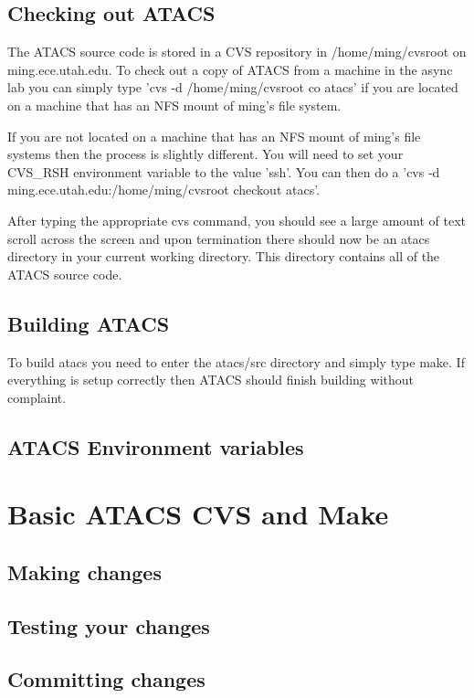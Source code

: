 \documentclass[titlepage,11pt]{article}
\begin{document}
  \subsection{Checking out ATACS}
  The ATACS source code is stored in a CVS repository in
  /home/ming/cvsroot on ming.ece.utah.edu.  To check out a copy of
  ATACS from a machine in the async lab you can simply type 'cvs -d
  /home/ming/cvsroot co atacs' if you are located on a machine that
  has an NFS mount of ming's file system.

  If you are not located on a machine that has an NFS mount of ming's
  file systems then the process is slightly different.  You will need
  to set your CVS\_RSH environment variable to the value 'ssh'.  You
  can then do a 'cvs -d ming.ece.utah.edu:/home/ming/cvsroot checkout
  atacs'.

  After typing the appropriate cvs command, you should see a large
  amount of text scroll across the screen and upon termination there
  should now be an atacs directory in your current working directory.
  This directory contains all of the ATACS source code.
  
  \subsection{Building ATACS}
  To build atacs you need to enter the atacs/src directory and simply
  type make.  If everything is setup correctly then ATACS should
  finish building without complaint.
  
  \subsection{ATACS Environment variables}


  \section{Basic ATACS CVS and Make}

  \subsection{Making changes}

  \subsection{Testing your changes}

  \subsection{Committing changes}
\end{document}
